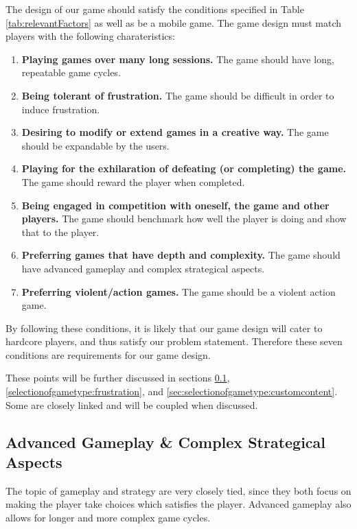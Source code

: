The design of our game should satisfy the conditions specified in Table \ref{tab:relevantFactors} as well as be a mobile game.
The game design must match players with the following charateristics:
\begin{enumerate}\label{gamedesign:selectionofgametype:importantstuff}
\item \textbf{Playing games over many long sessions.} The game should have long, repeatable game cycles.
\item \textbf{Being tolerant of frustration.} The game should be difficult in order to induce frustration.
\item \textbf{Desiring to modify or extend games in a creative way.} The game should be expandable by the users.
\item \textbf{Playing for the exhilaration of defeating (or completing) the game.} The game should reward the player when completed.
\item \textbf{Being engaged in competition with oneself, the game and other players.} The game should benchmark how well the player is doing and show that to the player.
\item \textbf{Preferring games that have depth and complexity.} The game should have advanced gameplay and complex strategical aspects.
\item \textbf{Preferring violent/action games.} The game should be a violent action game.
\end{enumerate}
By following these conditions, it is likely that our game design will cater to hardcore players, and thus satisfy our problem statement. 
Therefore these seven conditions are requirements for our game design.

These points will be further discussed in sections \ref{selectionofgametype:advancedgameplay}, \ref{selectionofgametype:frustration}, and \ref{sec:selectionofgametype:customcontent}.
Some are closely linked and will be coupled when discussed.

\subsection{Advanced Gameplay \& Complex Strategical Aspects}\label{selectionofgametype:advancedgameplay}
The topic of gameplay and strategy are very closely tied, since they both focus on making the player take choices which satisfies the player.
Advanced gameplay also allows for longer and more complex game cycles.

